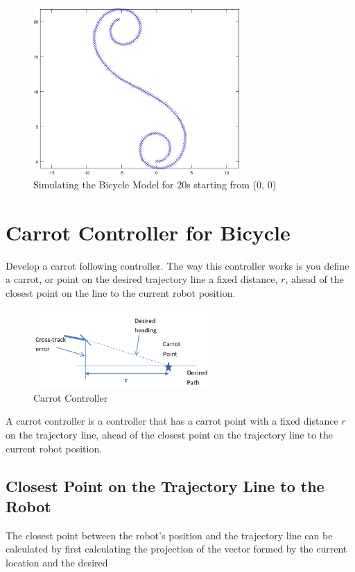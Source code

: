 \documentclass{article}
\begin{document}
\begin{figure}[H]
	\centering
	\includegraphics[width=0.7\textwidth]{images/bicycle_motion_20s.jpg}
	\caption{Simulating the Bicycle Model for 20s starting from (0, 0)}
	\label{fig:bicycle_20s}
\end{figure}


\newpage
\section{Carrot Controller for Bicycle}

Develop a carrot following controller.  The way this controller works is you define a carrot, or point on the desired trajectory line a fixed distance, $r$, ahead of the closest point on the line to the current robot position.

\begin{figure}[H]
	\centering
	\includegraphics[width=0.6\textwidth]{images/carrot_controller.png}
	\caption{Carrot Controller}
	\label{fig:carrot_controller}
\end{figure}

A carrot controller is a controller that has a carrot point with a fixed distance $r$ on the trajectory line, ahead of the closest point on the trajectory line to the current robot position.


\subsection{Closest Point on the Trajectory Line to the Robot}
The closest point between the robot's position and the trajectory line can be calculated by first calculating the projection of the vector formed by the current location and the desired 
\end{document}
